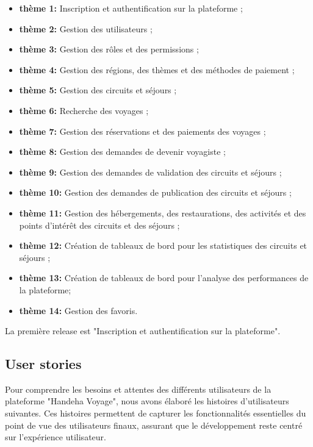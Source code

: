 \documentclass[12pt]{report}
\begin{document}
				\begin{itemize}
					\item \textbf{thème 1:} Inscription et authentification sur la plateforme ;
					\item \textbf{thème 2:} Gestion des utilisateurs ;
					\item \textbf{thème 3:} Gestion des rôles et des permissions ;
					\item \textbf{thème 4:} Gestion des régions, des thèmes et des méthodes de paiement ;
					\item \textbf{thème 5:} Gestion des circuits et séjours ;
					\item \textbf{thème 6:} Recherche des voyages ;
					\item \textbf{thème 7:} Gestion des réservations et des paiements des voyages ;
					\item \textbf{thème 8:} Gestion des demandes de devenir voyagiste ;
					\item \textbf{thème 9:} Gestion des demandes de validation des circuits et séjours ;
					\item \textbf{thème 10:} Gestion des demandes de publication des circuits et séjours ;
					\item \textbf{thème 11:} Gestion des hébergements, des restaurations, des activités et des points d'intérêt des circuits et des séjours ;
					\item \textbf{thème 12:} Création de tableaux de bord pour les statistiques des circuits et séjours ;
					\item \textbf{thème 13:} Création de tableaux de bord pour l'analyse des performances de la plateforme;
					\item \textbf{thème 14:} Gestion des favoris.
				\end{itemize}

				La première release est "Inscription et authentification sur la plateforme".

				\subsection{User stories}

				\hspace{15pt} Pour comprendre les besoins et attentes des différents utilisateurs de la plateforme "Handeha Voyage", nous avons élaboré les histoires d’utilisateurs suivantes. Ces histoires permettent de capturer les fonctionnalités essentielles du point de vue des utilisateurs finaux, assurant que le développement reste centré sur l’expérience utilisateur. \\
\end{document}
